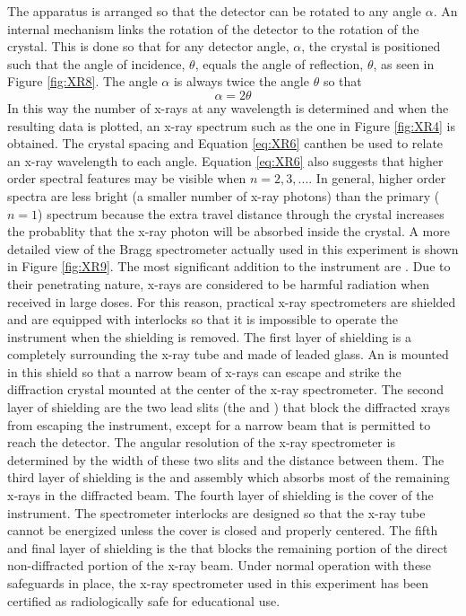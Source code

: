 \noindent The apparatus is arranged so that the detector can be rotated to any angle $\alpha$. An internal mechanism links the rotation of the detector to the rotation of the crystal. This is done so that for any detector angle, $\alpha$, the crystal is positioned such that the angle of incidence, $\theta$, equals the angle of reflection, $\theta$, as seen in Figure \ref{fig:XR8}. The angle $\alpha$ is always twice the angle $\theta$ so that \begin{equation}\label{eq:XR7}
    \alpha = 2\theta
\end{equation}
In this way the number of x-rays at any wavelength is determined and when the resulting data is plotted, an x-ray spectrum such as the one in Figure \ref{fig:XR4} is obtained. The crystal spacing and Equation \ref{eq:XR6} canthen be used to relate an x-ray wavelength to each angle. Equation \ref{eq:XR6} also suggests that higher order spectral features may be visible when $n = 2, 3, ... $. In general, higher order spectra are less bright (a smaller number of x-ray photons) than the primary ($n = 1$) spectrum because the extra travel distance through the crystal increases the probablity that the x-ray photon will be absorbed inside the crystal. A more detailed view of the Bragg spectrometer actually used in this experiment is shown in Figure \ref{fig:XR9}. The most significant addition to the instrument are . Due to their penetrating nature, x-rays are considered to be harmful radiation when received in large doses. For this reason, practical x-ray spectrometers are shielded and are equipped with interlocks so that it is impossible to operate the instrument when the shielding is removed. The first layer of shielding is a  completely surrounding the x-ray tube and made of leaded glass. An  is mounted in this shield so that a narrow beam of x-rays can escape and strike the diffraction crystal mounted at the center of the x-ray spectrometer. The second layer of shielding are the two lead slits (the  and ) that block the diffracted xrays from escaping the instrument, except for a narrow beam that is permitted to reach the detector. The angular resolution of the x-ray spectrometer is determined by the width of these two slits and the distance between them. The third layer of shielding is the  and  assembly which absorbs most of the remaining x-rays in the diffracted beam. The fourth layer of shielding is the cover of the instrument. The spectrometer interlocks are designed so that the x-ray tube cannot be energized unless the cover is closed and properly centered. The fifth and final layer of shielding is the  that blocks the remaining portion of the direct non-diffracted portion of the x-ray beam. Under normal operation with these safeguards in place, the x-ray spectrometer used in this experiment has been certified as radiologically safe for educational use.

